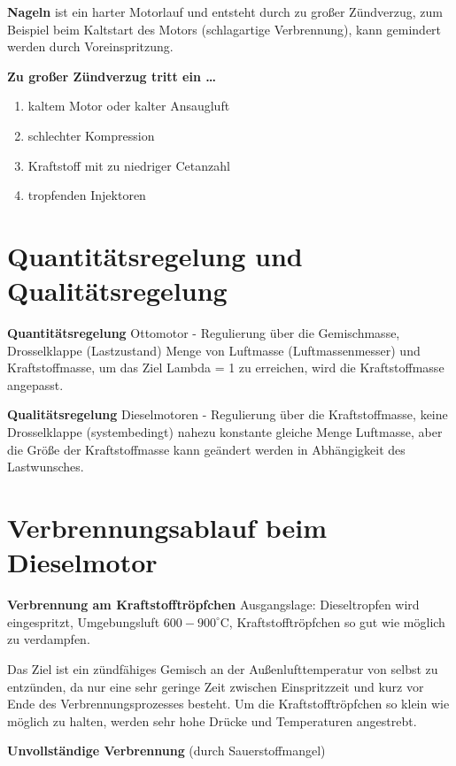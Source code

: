 \textbf{Nageln} ist ein harter Motorlauf und entsteht durch zu großer
Zündverzug, zum Beispiel beim Kaltstart des Motors (schlagartige
Verbrennung), kann gemindert werden durch Voreinspritzung.

\textbf{Zu großer Zündverzug tritt ein \ldots{}}

\begin{enumerate}
\item
  kaltem Motor oder kalter Ansaugluft
\item
  schlechter Kompression
\item
  Kraftstoff mit zu niedriger Cetanzahl
\item
  tropfenden Injektoren
\end{enumerate}

\section{Quantitätsregelung und
Qualitätsregelung}\label{quantitaetsregelung-und-qualitaetsregelung}

\textbf{Quantitätsregelung} Ottomotor - Regulierung über die
Gemischmasse, Drosselklappe (Lastzustand) Menge von Luftmasse
(Luftmassenmesser) und Kraftstoffmasse, um das Ziel Lambda = 1 zu
erreichen, wird die Kraftstoffmasse angepasst.

\textbf{Qualitätsregelung} Dieselmotoren - Regulierung über die
Kraftstoffmasse, keine Drosselklappe (systembedingt) nahezu konstante
gleiche Menge Luftmasse, aber die Größe der Kraftstoffmasse kann
geändert werden in Abhängigkeit des Lastwunsches.

\section{Verbrennungsablauf beim
Dieselmotor}\label{verbrennungsablauf-beim-dieselmotor}

\textbf{Verbrennung am Kraftstofftröpfchen} Ausgangslage: Dieseltropfen
wird eingespritzt, Umgebungsluft $600 - 900^\circ\text{C}$,
Kraftstofftröpfchen so gut wie möglich zu verdampfen.

Das Ziel ist ein zündfähiges Gemisch an der Außenlufttemperatur von
selbst zu entzünden, da nur eine sehr geringe Zeit zwischen
Einspritzzeit und kurz vor Ende des Verbrennungsprozesses besteht. Um
die Kraftstofftröpfchen so klein wie möglich zu halten, werden sehr hohe
Drücke und Temperaturen angestrebt.

\textbf{Unvollständige Verbrennung} (durch Sauerstoffmangel)

